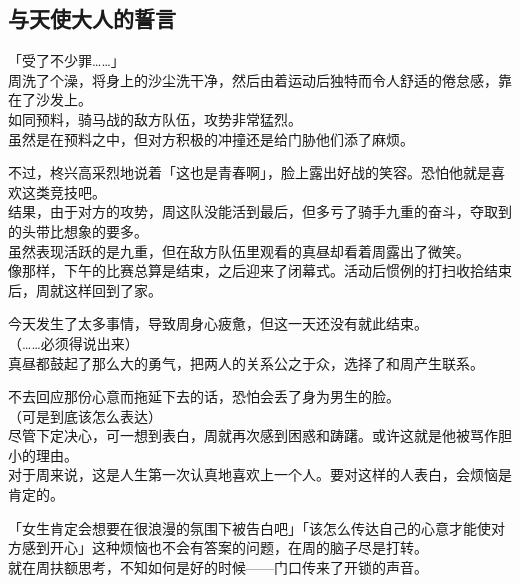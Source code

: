 \subsection{与天使大人的誓言}

「受了不少罪……」\\

周洗了个澡，将身上的沙尘洗干净，然后由着运动后独特而令人舒适的倦怠感，靠在了沙发上。\\

如同预料，骑马战的敌方队伍，攻势非常猛烈。\\

虽然是在预料之中，但对方积极的冲撞还是给门胁他们添了麻烦。

不过，柊兴高采烈地说着「这也是青春啊」，脸上露出好战的笑容。恐怕他就是喜欢这类竞技吧。\\

结果，由于对方的攻势，周这队没能活到最后，但多亏了骑手九重的奋斗，夺取到的头带比想象的要多。\\

虽然表现活跃的是九重，但在敌方队伍里观看的真昼却看着周露出了微笑。\\

像那样，下午的比赛总算是结束，之后迎来了闭幕式。活动后惯例的打扫收拾结束后，周就这样回到了家。

今天发生了太多事情，导致周身心疲惫，但这一天还没有就此结束。\\

（……必须得说出来）\\

真昼都鼓起了那么大的勇气，把两人的关系公之于众，选择了和周产生联系。

不去回应那份心意而拖延下去的话，恐怕会丢了身为男生的脸。\\

（可是到底该怎么表达）\\

尽管下定决心，可一想到表白，周就再次感到困惑和踌躇。或许这就是他被骂作胆小的理由。\\

对于周来说，这是人生第一次认真地喜欢上一个人。要对这样的人表白，会烦恼是肯定的。

「女生肯定会想要在很浪漫的氛围下被告白吧」「该怎么传达自己的心意才能使对方感到开心」这种烦恼也不会有答案的问题，在周的脑子尽是打转。\\

就在周扶额思考，不知如何是好的时候——门口传来了开锁的声音。\\

